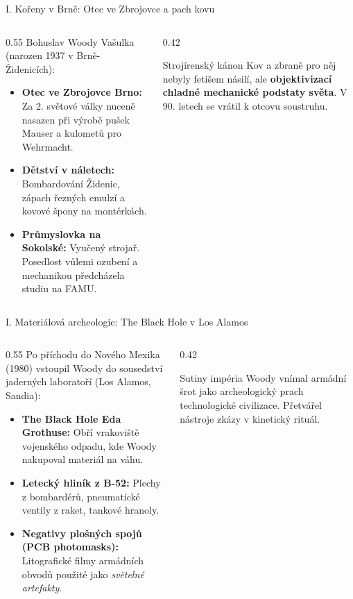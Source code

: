 \documentclass[aspectratio=169,11pt]{beamer}
\begin{document}
\begin{frame}{I. Kořeny v Brně: Otec ve Zbrojovce a pach kovu}
  \begin{columns}
    \begin{column}{0.55\textwidth}
      Bohuslav Woody Vašulka (narozen 1937 v Brně-Židenicích):
      \begin{itemize}
        \item \textbf{Otec ve Zbrojovce Brno:} Za 2. světové války nuceně nasazen při výrobě pušek Mauser a kulometů pro Wehrmacht.
        \item \textbf{Dětství v náletech:} Bombardování Židenic, zápach řezných emulzí a kovové špony na montérkách.
        \item \textbf{Průmyslovka na Sokolské:} Vyučený strojař. Posedlost vůlemi ozubení a mechanikou předcházela studiu na FAMU.
      \end{itemize}
    \end{column}
    \begin{column}{0.42\textwidth}
      \begin{block}{Strojírenský kánon}
        Kov a zbraně pro něj nebyly fetišem násilí, ale \textbf{objektivizací chladné mechanické podstaty světa}. V 90. letech se vrátil k otcovu soustruhu.
      \end{block}
    \end{column}
  \end{columns}
\end{frame}

\begin{frame}{I. Materiálová archeologie: The Black Hole v Los Alamos}
  \begin{columns}
    \begin{column}{0.55\textwidth}
      Po příchodu do Nového Mexika (1980) vstoupil Woody do sousedství jaderných laboratoří (Los Alamos, Sandia):
      \begin{itemize}
        \item \textbf{The Black Hole Eda Grothuse:} Obří vrakoviště vojenského odpadu, kde Woody nakupoval materiál na váhu.
        \item \textbf{Letecký hliník z B-52:} Plechy z bombardérů, pneumatické ventily z raket, tankové hranoly.
        \item \textbf{Negativy plošných spojů (PCB photomasks):} Litografické filmy armádních obvodů použité jako \textit{světelné artefakty}.
      \end{itemize}
    \end{column}
    \begin{column}{0.42\textwidth}
      \begin{block}{Sutiny impéria}
        Woody vnímal armádní šrot jako archeologický prach technologické civilizace. Přetvářel nástroje zkázy v kinetický rituál.
      \end{block}
    \end{column}
  \end{columns}
\end{frame}
\end{document}
